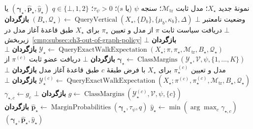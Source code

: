 \begin{algorithm}[!htbp]
\caption{روند $\operatorname{PredictLabel}$: پیش‌بینی برچسب نمونهٔ جدید}
\label{cmp:alg:ch3-predict-label}
\begin{algorithmic}[1]
\REQUIRE نمونهٔ جدید $X_\star$؛ مدل ثابت $\mathcal M_{\mathrm{tr}}$؛
سنجه $\psi$ (یا $s$)؛ $\tau_\psi>0$؛ $q\in\{\bot,1,2\}$
\ENSURE $(\boldsymbol\gamma_\star,\widehat{\boldsymbol p}_\star,
\widehat y_\star)$ یا وضعیت نامعتبر $\bot$
\STATE $(B_\star,\mathcal Q_\star)\gets
\operatorname{QueryVertical}(X_\star,\{D_b\},\{\mu_b,\kappa_b\},\Delta)$
    \STATE \textbf{بازگردان} $\bot$
\ENDIF
{}
    \STATE دریافت سیاست ثابت $\pi$ از مدل و تعیین
    $\pi_\star$ برای $X_\star$ طبق قاعدهٔ آغاز مدل
    در زیربخش~\ref{cmp:subsec:ch3-out-of-graph-policy}
        \STATE \textbf{بازگردان} $\bot$
    \ENDIF
    \STATE $\mathscr Y_\star\gets
    \operatorname{QueryExactWalkExpectation}
    (X_\star;\pi,\pi_\star,\mathcal M_{\mathrm{tr}},B_\star,\mathcal Q_\star)$
        \STATE \textbf{بازگردان} $\bot$
    \ENDIF
    \STATE $\boldsymbol\gamma_\star\gets
    \operatorname{ClassMargins}(\mathscr Y_\star,\mathcal V,\psi,\{1,\ldots,K\})$
    \IF{$\boldsymbol\gamma_\star=\bot$}
        \STATE \textbf{بازگردان} $\bot$
    \ENDIF
\ELSE
        \STATE دریافت عضو ثابت $\pi^{(c)}$ از مدل و تعیین
        $\pi_\star^{(c)}$ برای $X_\star$ با فرض طبقهٔ $c$
        طبق قاعدهٔ آغاز مدل
            \STATE \textbf{بازگردان} $\bot$
        \ENDIF
        \STATE $\mathscr Y_\star^{(c)}\gets
        \operatorname{QueryExactWalkExpectation}
        (X_\star;\pi^{(c)},\pi_\star^{(c)},\mathcal M_{\mathrm{tr}},B_\star,\mathcal Q_\star)$
            \STATE \textbf{بازگردان} $\bot$
        \ENDIF
        \STATE $g\gets
        \operatorname{ClassMargins}(\mathscr Y_\star^{(c)},\mathcal V,\psi,\{c\})$
            \STATE \textbf{بازگردان} $\bot$
        \ENDIF
        \STATE $\gamma_{\star,c}\gets g_c$
    \ENDFOR
\ENDIF
\STATE $\widehat y_\star\gets\min(\arg\max_c\gamma_{\star,c})$
\STATE $\widehat{\boldsymbol p}_\star\gets
\operatorname{MarginProbabilities}(\boldsymbol\gamma_\star,\tau_\psi,q)$
\STATE \textbf{بازگردان}
$(\boldsymbol\gamma_\star,\widehat{\boldsymbol p}_\star,\widehat y_\star)$
\end{algorithmic}
\end{algorithm}

